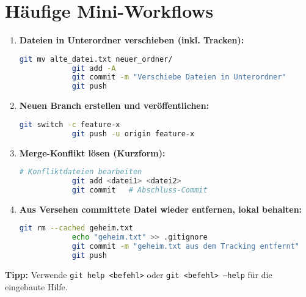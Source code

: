 \documentclass[a4paper,11pt]{article}
\begin{document}
	\section{Häufige Mini-Workflows}
	\begin{enumerate}
		\item \textbf{Dateien in Unterordner verschieben (inkl. Tracken):}
		\begin{lstlisting}[language=bash]
			git mv alte_datei.txt neuer_ordner/
			git add -A
			git commit -m "Verschiebe Dateien in Unterordner"
			git push
		\end{lstlisting}
		\item \textbf{Neuen Branch erstellen und veröffentlichen:}
		\begin{lstlisting}[language=bash]
			git switch -c feature-x
			git push -u origin feature-x
		\end{lstlisting}
		\item \textbf{Merge-Konflikt lösen (Kurzform):}
		\begin{lstlisting}[language=bash]
			# Konfliktdateien bearbeiten
			git add <datei1> <datei2>
			git commit   # Abschluss-Commit
		\end{lstlisting}
		\item \textbf{Aus Versehen committete Datei wieder entfernen, lokal behalten:}
		\begin{lstlisting}[language=bash]
			git rm --cached geheim.txt
			echo "geheim.txt" >> .gitignore
			git commit -m "geheim.txt aus dem Tracking entfernt"
			git push
		\end{lstlisting}
	\end{enumerate}
	
	\bigskip
	\noindent\textbf{Tipp:} Verwende \texttt{git help <befehl>} oder \texttt{git <befehl> --help} für die eingebaute Hilfe.
	
\end{document}
